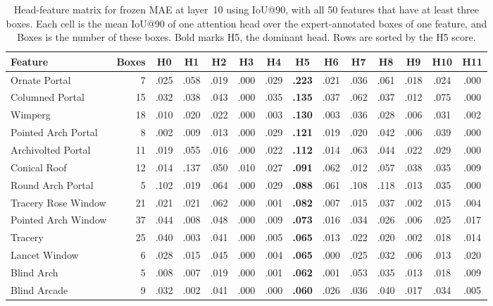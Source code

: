 \documentclass[lineno,pdflatex,sn-mathphys-num]{sn-jnl}%
\theoremstyle{thmstyleone}%
\theoremstyle{thmstyletwo}%
\theoremstyle{thmstylethree}%
\begin{document}
\begin{appendices}
\begin{table}[!htbp]
\centering
\caption{Head-feature matrix for frozen MAE at layer~10 using IoU@90, with all 50 features that have at least three boxes. Each cell is the mean IoU@90 of one attention head over the expert-annotated boxes of one feature, and Boxes is the number of these boxes. Bold marks H5, the dominant head. Rows are sorted by the H5 score.\label{table appendix head feature mae}}
\setlength{\tabcolsep}{3pt}
\begin{tabular}{@{}lrcccccccccccc@{}}
\toprule
Feature & Boxes & H0 & H1 & H2 & H3 & H4 & \textbf{H5} & H6 & H7 & H8 & H9 & H10 & H11 \\ \midrule
Ornate Portal & 7 & .025 & .058 & .019 & .000 & .029 & \textbf{.223} & .021 & .036 & .061 & .018 & .024 & .000 \\
Columned Portal & 15 & .032 & .038 & .043 & .000 & .035 & \textbf{.135} & .037 & .062 & .037 & .012 & .075 & .000 \\
Wimperg & 18 & .010 & .020 & .022 & .000 & .003 & \textbf{.130} & .003 & .036 & .028 & .006 & .031 & .002 \\
Pointed Arch Portal & 8 & .002 & .009 & .013 & .000 & .029 & \textbf{.121} & .019 & .020 & .042 & .006 & .039 & .000 \\
Archivolted Portal & 11 & .019 & .055 & .016 & .000 & .022 & \textbf{.112} & .014 & .063 & .044 & .022 & .029 & .000 \\
Conical Roof & 12 & .014 & .137 & .050 & .010 & .027 & \textbf{.091} & .062 & .012 & .057 & .038 & .035 & .009 \\
Round Arch Portal & 5 & .102 & .019 & .064 & .000 & .029 & \textbf{.088} & .061 & .108 & .118 & .013 & .035 & .000 \\
Tracery Rose Window & 21 & .021 & .021 & .062 & .000 & .001 & \textbf{.082} & .007 & .015 & .037 & .002 & .015 & .004 \\
Pointed Arch Window & 37 & .044 & .008 & .048 & .000 & .009 & \textbf{.073} & .016 & .034 & .026 & .006 & .025 & .017 \\
Tracery & 25 & .040 & .003 & .041 & .000 & .005 & \textbf{.065} & .013 & .022 & .020 & .002 & .018 & .014 \\
Lancet Window & 6 & .028 & .015 & .045 & .000 & .004 & \textbf{.065} & .000 & .025 & .032 & .006 & .013 & .020 \\
Blind Arch & 5 & .008 & .007 & .019 & .000 & .001 & \textbf{.062} & .001 & .053 & .035 & .013 & .018 & .009 \\
Blind Arcade & 9 & .032 & .002 & .041 & .000 & .000 & \textbf{.060} & .026 & .036 & .040 & .017 & .034 & .005 \\

\end{tabular}
\end{table}
\end{appendices}
\end{document}

